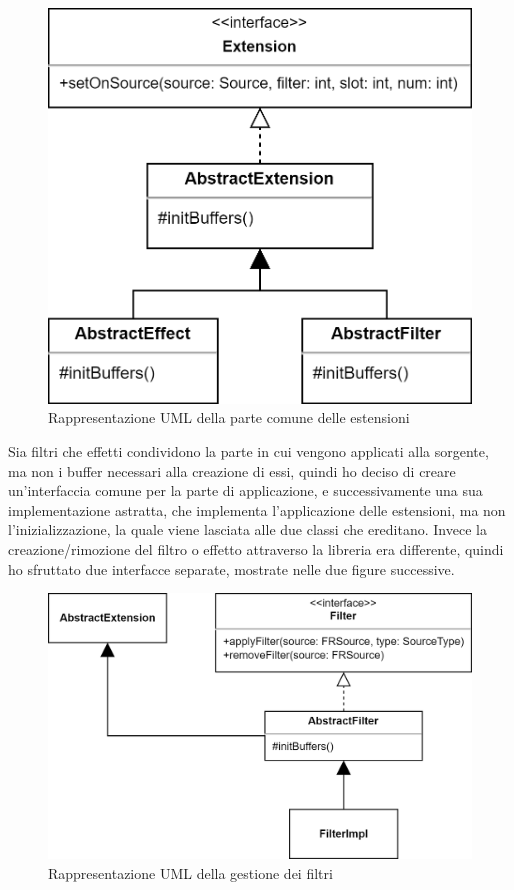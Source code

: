\documentclass[a4paper,12pt]{report}
\begin{document}
\begin{figure}[H]
\centering{}
\includegraphics[width=\textwidth]{img/extension/Extensions.png}
\caption{Rappresentazione UML della parte comune delle estensioni}
\label{img:extensions}
\end{figure}
Sia filtri che effetti condividono la parte in cui vengono applicati alla sorgente, ma non i buffer necessari alla creazione di essi, quindi ho deciso di creare un’interfaccia comune per la parte di applicazione, e successivamente una sua implementazione astratta, che implementa l’applicazione delle estensioni, ma non l’inizializzazione, la quale viene lasciata alle due classi che ereditano. Invece la creazione/rimozione del filtro o effetto attraverso la libreria era differente, quindi ho sfruttato due interfacce separate, mostrate nelle due figure successive.
%
\begin{figure}[H]
\centering{}
\includegraphics[width=\textwidth]{img/extension/Filter.png}
\caption{Rappresentazione UML della gestione dei filtri}
\label{img:filter}
\end{figure}
\end{document}
